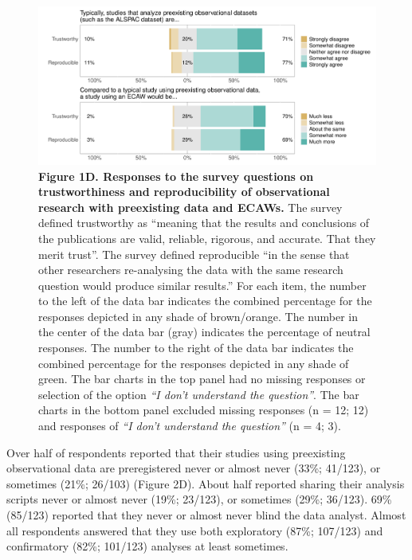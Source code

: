 \documentclass[
  man,floatsintext]{apa6}
\begin{document}
\begin{figure}[H]

{\centering \includegraphics[width=1\linewidth]{figs/typicallyEcawPlotAll-1} 

}

\caption{\textbf{Figure 1D. Responses to the survey questions on trustworthiness and reproducibility of observational research with preexisting data and ECAWs.} The survey defined trustworthy as ``meaning that the results and conclusions of the publications are valid, reliable, rigorous, and accurate. That they merit trust''. The survey defined reproducible ``in the sense that other researchers re-analysing the data with the same research question would produce similar results.'' For each item, the number to the left of the data bar indicates the combined percentage for the responses depicted in any shade of brown/orange. The number in the center of the data bar (gray) indicates the percentage of neutral responses. The number to the right of the data bar indicates the combined percentage for the responses depicted in any shade of green. The bar charts in the top panel had no missing responses or selection of the option \emph{``I don't understand the question''}. The bar charts in the bottom panel excluded missing responses (n = 12; 12) and responses of \emph{``I don't understand the question''} (n = 4; 3).}\label{fig:typicallyEcawPlotAll}
\end{figure}

{\smaller[1]
\begin{singlespace}



\end{singlespace}
}

Over half of respondents reported that their studies using preexisting observational data are preregistered never or almost never (33\%; 41/123), or sometimes (21\%; 26/103) (Figure 2D). About half reported sharing their analysis scripts never or almost never (19\%; 23/123), or sometimes (29\%; 36/123). 69\% (85/123) reported that they never or almost never blind the data analyst. Almost all respondents answered that they use both exploratory (87\%; 107/123) and confirmatory (82\%; 101/123) analyses at least sometimes.
\end{document}
